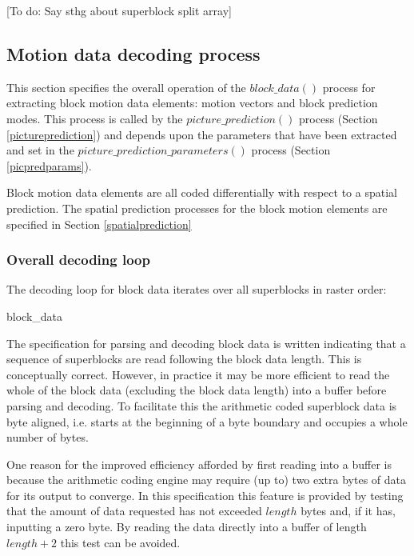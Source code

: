 [To do: Say sthg about superblock split array]

\subsection{Motion data decoding process}

This section specifies the overall operation of the $block\_data()$ process for extracting
block motion data elements: motion vectors and block prediction modes. This 
process is called by the $picture\_prediction()$ process (Section \ref{pictureprediction}) and
depends upon the parameters that have been extracted and set in the
$picture\_prediction\_parameters()$ process (Section \ref{picpredparams}).

Block motion data elements are all coded differentially with respect to a spatial prediction. The
spatial prediction processes for the block motion elements are specified in Section \ref{spatialprediction}

\subsubsection{Overall decoding loop}

\label{decodingloop}

The decoding loop for block data iterates over all superblocks in raster order:

\begin{pseudo}{block\_data}{}
            \bsEND
        \bsEND
    \bsEND
\bsEND
{}
\end{pseudo}

\begin{informative}
The specification for parsing and decoding block data is written indicating that a sequence of 
superblocks are read following the block data length. This is conceptually correct. However, 
in practice it may be more efficient to read the whole of the block data (excluding the block 
data length) into a buffer before parsing and decoding. To facilitate this the arithmetic coded 
superblock data is byte aligned, i.e. starts at the beginning of a byte boundary and occupies a 
whole number of bytes.

One reason for the improved efficiency afforded by first reading into a buffer is because the 
arithmetic coding engine may require (up to) two extra bytes of data for its output to 
converge. In this specification this feature is provided by testing that the amount of data 
requested has not exceeded $length$ bytes and, if it has, inputting a zero byte. By 
reading the data directly into a buffer of length  $length + 2$ this test can be 
avoided.
\end{informative}

